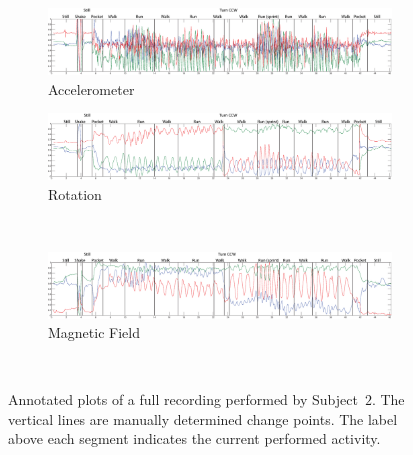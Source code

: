 \begin{figure}
  \centering
  \begin{subfigure}[b]{1\textwidth}
    \includegraphics[width=\textwidth]{./Figures/chapter6/data_collection/run-1-walk-run-roemer/data_plot_acc_annotated.eps}
    \caption{Accelerometer}
    \label{fig:recording_subject_1_run_1_accelerometer}
  \end{subfigure}

  \begin{subfigure}[b]{1\textwidth}
    \includegraphics[width=\textwidth]{./Figures/chapter6/data_collection/run-1-walk-run-roemer/data_plot_rot_annotated.eps}
    \caption{Rotation}
    \label{fig:recording_subject_1_run_1_rotation}
  \end{subfigure} \\

  \begin{subfigure}[b]{1\textwidth}
    \includegraphics[width=\textwidth]{./Figures/chapter6/data_collection/run-1-walk-run-roemer/data_plot_mag_annotated.eps}
    \caption{Magnetic Field}
    \label{fig:recording_subject_1_run_1_magnetic}
  \end{subfigure} \\
  \caption[Plots]{Annotated plots of a full recording performed by Subject~$2$. The vertical lines are manually determined change points. The label above each segment indicates the current performed activity.}\label{fig:plots_subject_1}
\end{figure}



